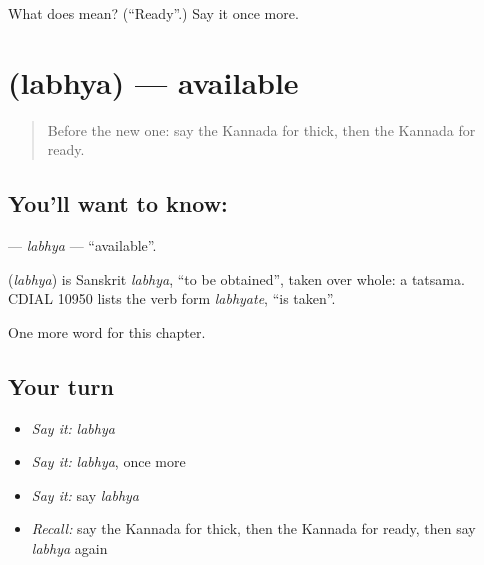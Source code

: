 \begin{tcolorbox}[breakable,colback=teal!4,colframe=teal!35!black,title={Before you move on}]
What does  mean? (\textquotedblleft{}Ready\textquotedblright{}.) Say it once more.
\end{tcolorbox}
\section[\texorpdfstring{\kn{ಲಭ್ಯ} (labhya)}{ಲಭ್ಯ (labhya)}]{ (labhya) — available}

\label{lesson:KA-C218-labhya}



\begin{quote}
Before the new one: say the Kannada for thick, then the Kannada for ready.
\end{quote}

\subsection*{You'll want to know: }
\textbf{} — \emph{labhya} — \textquotedblleft{}available\textquotedblright{}.

\begin{cousinweb}
\textbf{} (\emph{labhya}) is Sanskrit \emph{labhya}, \textquotedblleft{}to be obtained\textquotedblright{}, taken over whole: a tatsama. CDIAL 10950 lists the verb form \emph{labhyate}, \textquotedblleft{}is taken\textquotedblright{}.
\end{cousinweb}

\begin{grammarlens}[title={What you've built}]
One more word for this chapter.
\end{grammarlens}

\subsection*{Your turn}
\begin{itemize}
\raggedright
  \item \emph{Say it:} \emph{labhya}
  \item \emph{Say it:} \emph{labhya}, once more
  \item \emph{Say it:} say \emph{labhya}
  \item \emph{Recall:} say the Kannada for thick, then the Kannada for ready, then say \emph{labhya} again
\end{itemize}


